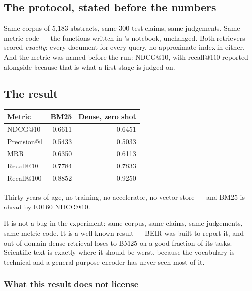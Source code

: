 \documentclass[11pt,a4paper]{article}
\begin{document}
\subsection{The protocol, stated before the numbers}

Same corpus of 5{,}183 abstracts, same 300 test claims, same judgements. Same
metric code --- the functions written in 's notebook, unchanged.
Both retrievers scored \emph{exactly}: every document for every query, no
approximate index in either. And the metric was named before the run: NDCG@10,
with recall@100 reported alongside because that is what a first stage is judged
on.

\subsection{The result}

\begin{center}
\small
\begin{tabular}{lrr}
\toprule
\textbf{Metric} & \textbf{BM25} & \textbf{Dense, zero shot} \\
\midrule
NDCG@10     & 0.6611 & 0.6451 \\
Precision@1 & 0.5433 & 0.5033 \\
MRR         & 0.6350 & 0.6113 \\
Recall@10   & 0.7784 & 0.7833 \\
Recall@100  & 0.8852 & 0.9250 \\
\bottomrule
\end{tabular}
\end{center}

\begin{keybox}[title={The neural model loses on the headline metric}]
Thirty years of age, no training, no accelerator, no vector store --- and BM25
is ahead by 0.0160 NDCG@10.
\end{keybox}

It is not a bug in the experiment: same corpus, same claims, same judgements,
same metric code. It is a well-known result --- BEIR was built to report it,
and out-of-domain dense retrieval loses to BM25 on a good fraction of its
tasks. Scientific text is exactly where it should be worst, because the
vocabulary is technical and a general-purpose encoder has never seen most of
it.

\subsubsection{What this result does not license}
\end{document}
